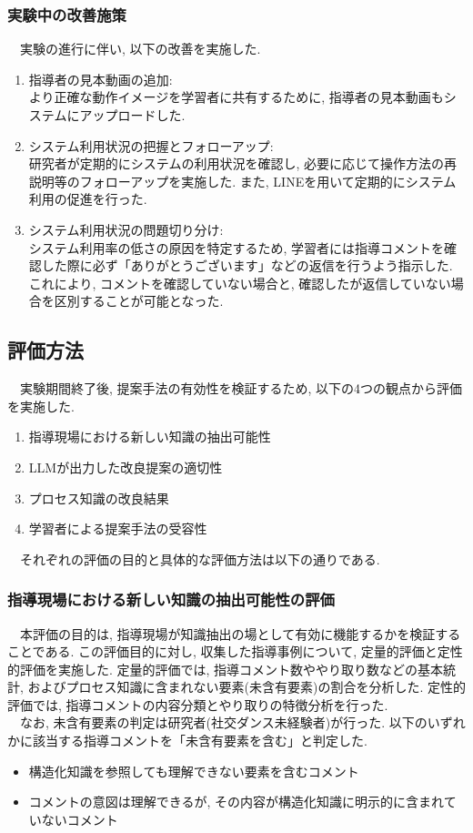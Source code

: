 \subsubsection{実験中の改善施策}
　実験の進行に伴い, 以下の改善を実施した.\\

\begin{enumerate}
    \item 指導者の見本動画の追加:\\
    より正確な動作イメージを学習者に共有するために, 指導者の見本動画もシステムにアップロードした.
    \item システム利用状況の把握とフォローアップ:\\
    研究者が定期的にシステムの利用状況を確認し, 必要に応じて操作方法の再説明等のフォローアップを実施した. また, LINEを用いて定期的にシステム利用の促進を行った.
    \item システム利用状況の問題切り分け:\\
    システム利用率の低さの原因を特定するため, 学習者には指導コメントを確認した際に必ず「ありがとうございます」などの返信を行うよう指示した. これにより, コメントを確認していない場合と, 確認したが返信していない場合を区別することが可能となった.
\end{enumerate}


\subsection{評価方法}
　実験期間終了後, 提案手法の有効性を検証するため, 以下の4つの観点から評価を実施した. \\
\begin{enumerate}
    \item 指導現場における新しい知識の抽出可能性
    \item LLMが出力した改良提案の適切性
    \item プロセス知識の改良結果
    \item 学習者による提案手法の受容性
\end{enumerate}
　それぞれの評価の目的と具体的な評価方法は以下の通りである.

\subsubsection{指導現場における新しい知識の抽出可能性の評価}
　本評価の目的は, 指導現場が知識抽出の場として有効に機能するかを検証することである. この評価目的に対し, 収集した指導事例について, 定量的評価と定性的評価を実施した. 定量的評価では, 指導コメント数ややり取り数などの基本統計, およびプロセス知識に含まれない要素(未含有要素)の割合を分析した. 定性的評価では, 指導コメントの内容分類とやり取りの特徴分析を行った.\\
　なお, 未含有要素の判定は研究者(社交ダンス未経験者)が行った. 以下のいずれかに該当する指導コメントを「未含有要素を含む」と判定した.\\
\begin{itemize}
    \item 構造化知識を参照しても理解できない要素を含むコメント
    \item コメントの意図は理解できるが, その内容が構造化知識に明示的に含まれていないコメント
\end{itemize}

